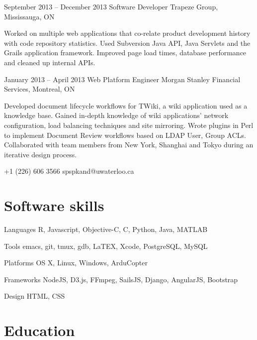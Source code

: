 \documentclass{tccv}
\begin{document}
\begin{eventlist}
\item{September 2013 -- December 2013}
     {Software Developer}
     {Trapeze Group, Mississauga, ON}

Worked on multiple web applications that co-relate product development history with code repository statistics. Used Subversion Java API, Java Servlets and the Grails application framework. Improved page load times, database performance and cleaned up internal APIs.

\item{January 2013 -- April 2013}
     {Web Platform Engineer}
     {Morgan Stanley Financial Services, Montreal, ON}

Developed document lifecycle workflows for TWiki, a wiki application used as a knowledge base. Gained in-depth knowledge of wiki applications' network configuration, load balancing techniques and site mirroring. Wrote plugins in Perl to implement Document Review workflows based on LDAP User, Group ACLs. Collaborated with team members from New York, Shanghai and Tokyo during an iterative design process.

\end{eventlist}

    {+1 (226) 606 3566}
    {spspkand@uwaterloo.ca}

\section{Software skills}

\begin{factlist}

    \item{Languages}
     {R, Javascript, Objective-C, C, Python, Java, MATLAB}

    \item{Tools}
     {emacs, git, tmux, gdb, LaTEX, Xcode, PostgreSQL, MySQL}

    \item{Platforms}
     {OS X, Linux, Windows, ArduCopter}

    \item{Frameworks}
     {NodeJS, D3.js, FFmpeg, SailsJS, Django, AngularJS, Bootstrap}

    \item{Design}
     {HTML, CSS}

\end{factlist}

\section{Education}
\end{document}
